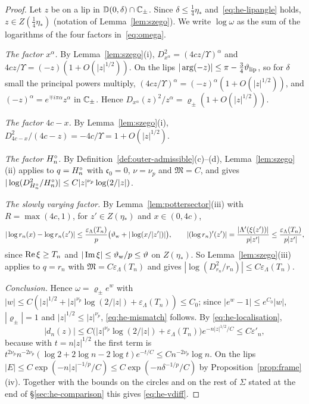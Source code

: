 \begin{proof}
Let $z$ be on a lip in $\mathbb D(0,\delta)\cap\mathbb{C}_\pm$. Since $\delta\le\frac14\eta_*$ and~\eqref{eq:he-lipangle} holds, $z\in
Z(\frac14\eta_*)$ (notation of Lemma~\ref{lem:szego}). We write $\log\omega$ as the sum of the logarithms of the four
factors in~\eqref{eq:omega}.

\emph{The factor $x^\alpha$.} By Lemma~\ref{lem:szego}(i), $D_{x^\alpha}^2=(4cz/\Upsilon)^\alpha$ and
$4cz/\Upsilon=(-z)(1+O(|z|^{1/2}))$. On the lips $|\arg(-z)|\le\pi-\frac34\vartheta_{\mathrm{lip}}$, so for $\delta$ small the principal
powers multiply, $(4cz/\Upsilon)^\alpha=(-z)^\alpha(1+O(|z|^{1/2}))$, and $(-z)^\alpha=e^{\mp i\pi\alpha}z^\alpha$ in $\mathbb{C}_\pm$.
Hence $D_{x^\alpha}(z)^2/z^\alpha=\varrho_\pm(1+O(|z|^{1/2}))$.

\emph{The factor $4c-x$.} By Lemma~\ref{lem:szego}(i), $D_{4c-x}^2/(4c-z)=-4c/\Upsilon=1+O(|z|^{1/2})$.

\emph{The factor $H^{\circ}_n$.} By Definition~\ref{def:outer-admissible}(c)--(d), Lemma~\ref{lem:szego}(ii) applies to $q=H^{\circ}_n$ with $\mathfrak c_0=0$, $\nu=\nu_p$ and
$\mathfrak M=C$, and gives $|\log(D_{H^{\circ}_n}^2/H^{\circ}_n)|\le C|z|^{\nu_p}\log(2/|z|)$.

\emph{The slowly varying factor.} By Lemma~\ref{lem:pottersector}(iii) with $R=\max(4c,1)$, for $z'\in Z(\eta_*)$ and
$x\in(0,4c)$,
\[
  |\log r_n(x)-\log r_n(z')|\le\frac{\varepsilon_\Lambda(T_n)}p\bigl(\vartheta_{\mathrm{w}}+|\log(x/|z'|)|\bigr),\qquad
  |(\log r_n)'(z')|=\frac{|\Lambda'(\xi(z'))|}{p|z'|}\le\frac{\varepsilon_\Lambda(T_n)}{p|z'|},
\]
since $\operatorname{Re}\xi\ge T_n$ and $|\operatorname{Im}\xi|\le\vartheta_{\mathrm{w}}/p\le\vartheta$ on $Z(\eta_*)$. So Lemma~\ref{lem:szego}(iii) applies to $q=r_n$
with $\mathfrak M=C\varepsilon_\Lambda(T_n)$ and gives $|\log(D_{r_n}^2/r_n)|\le C\varepsilon_\Lambda(T_n)$.

\emph{Conclusion.} Hence $\omega=\varrho_\pm e^{w}$ with
$|w|\le C(|z|^{1/2}+|z|^{\nu_p}\log(2/|z|)+\varepsilon_\Lambda(T_n))\le C_0$; since $|e^w-1|\le e^{C_0}|w|$, $|\varrho_\pm|=1$
and $|z|^{1/2}\le|z|^{\nu_p}$, \eqref{eq:he-mismatch} follows. By \eqref{eq:he-localisation},
\[
  |d_n(z)|\le C\bigl(|z|^{\nu_p}\log(2/|z|)+\varepsilon_\Lambda(T_n)\bigr)e^{-n|z|^{1/2}/C}\le C\varepsilon'_n,
\]
because with $t=n|z|^{1/2}$ the first term is $t^{2\nu_p}n^{-2\nu_p}(\log2+2\log n-2\log t)e^{-t/C}\le Cn^{-2\nu_p}\log n$.
On the lips $|E|\le C\exp(-n|z|^{-1/p}/C)\le C\exp(-n\delta^{-1/p}/C)$ by Proposition~\ref{prop:frame}(iv). Together with the bounds on the circles and
on the rest of $\Sigma$ stated at the end of \S\ref{sec:he-comparison} this gives \eqref{eq:he-vdiff}.
\end{proof}


